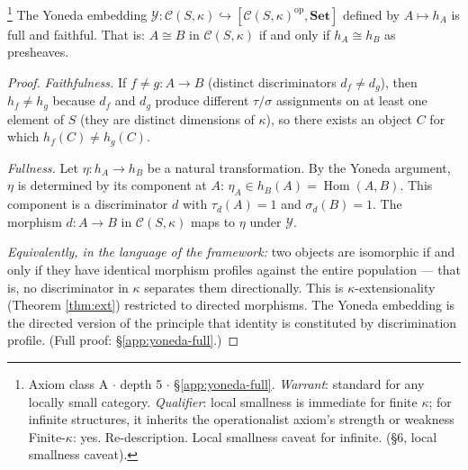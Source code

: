 \begin{theorem}[Yoneda]\label{thm:yoneda}\footnote{Axiom class \textsf{A} $\cdot$ depth 5 $\cdot$ \S\ref{app:yoneda-full}.  \emph{Warrant}: standard for any locally small category. \emph{Qualifier}: local smallness is immediate for finite $\kappa$; for infinite structures, it inherits the operationalist axiom's strength or weakness Finite-$\kappa$: yes. Re-description. Local smallness caveat for infinite. (\S6, local smallness caveat).}
The Yoneda embedding
$\mathcal{Y}: \mathcal{C}(S,\kappa) \hookrightarrow
[\mathcal{C}(S,\kappa)^{\mathrm{op}}, \mathbf{Set}]$
defined by $A \mapsto h_A$ is full and faithful. That is:
$A \cong B$ in $\mathcal{C}(S,\kappa)$ if and only if
$h_A \cong h_B$ as presheaves.
\end{theorem}

\begin{proof}
\emph{Faithfulness.}
If $f \neq g: A \to B$ (distinct discriminators $d_f \neq d_g$),
then $h_f \neq h_g$ because $d_f$ and $d_g$ produce
different $\tau/\sigma$ assignments on at least one element
of $S$ (they are distinct dimensions of $\kappa$), so
there exists an object $C$ for which
$h_f(C) \neq h_g(C)$.

\emph{Fullness.}
Let $\eta: h_A \to h_B$ be a natural transformation. By
the Yoneda argument, $\eta$ is determined by its component
at $A$: $\eta_A \in h_B(A) = \operatorname{Hom}(A, B)$.
This component is a discriminator $d$ with $\tau_d(A) = 1$
and $\sigma_d(B) = 1$. The morphism $d: A \to B$ in
$\mathcal{C}(S,\kappa)$ maps to $\eta$ under $\mathcal{Y}$.

\emph{Equivalently, in the language of the framework:}
two objects are isomorphic if and only if they have
identical morphism profiles against the entire population
--- that is, no discriminator in $\kappa$ separates them
directionally. This is $\kappa$-extensionality
(Theorem \ref{thm:ext}) restricted to directed morphisms.
The Yoneda embedding is the directed version of the
principle that identity is constituted by discrimination
profile.
(Full proof: \S\ref{app:yoneda-full}.)
\end{proof}

